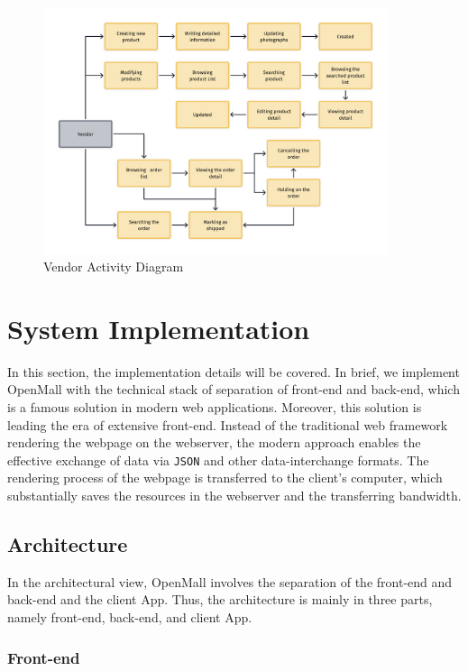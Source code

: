 \documentclass{article}
\begin{document}
\begin{figure}[!htp]
    \centering
    \includegraphics[width=0.9\textwidth]{Vendor activity diagram.png}
    \caption{\label{fig:Vendor activity diagram}Vendor Activity Diagram}
\end{figure}

\clearpage
\section{System Implementation}

In this section, the implementation details will be covered. In brief, we implement OpenMall with the technical stack of separation of front-end and back-end, which is a famous solution in modern web applications. Moreover, this solution is leading the era of extensive front-end. Instead of the traditional web framework rendering the webpage on the webserver, the modern approach enables the effective exchange of data via \verb|JSON| and other data-interchange formats. The rendering process of the webpage is transferred to the client's computer, which substantially saves the resources in the webserver and the transferring bandwidth.

\subsection{Architecture}

In the architectural view, OpenMall involves the separation of the front-end and back-end and the client App. Thus, the architecture is mainly in three parts, namely front-end, back-end, and client App.

\subsubsection{Front-end}
\end{document}

